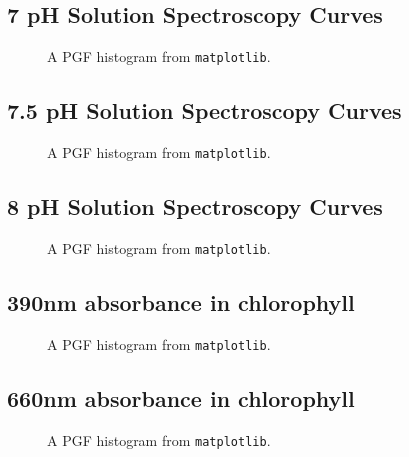 \documentclass[a4paper]{article}
\begin{document}
\subsection*{7 pH Solution Spectroscopy Curves}
\begin{figure}[h]
    \begin{center}
        
    \end{center}
    \caption{A PGF histogram from \texttt{matplotlib}.}
\end{figure}
\newpage

\subsection*{7.5 pH Solution Spectroscopy Curves}
\begin{figure}[h]
    \begin{center}
        
    \end{center}
    \caption{A PGF histogram from \texttt{matplotlib}.}
\end{figure}
\newpage

\subsection*{8 pH Solution Spectroscopy Curves}
\begin{center}
\begin{figure}[h]
        
    \caption{A PGF histogram from \texttt{matplotlib}.}
\end{figure}
\end{center}
\newpage

\subsection*{390nm absorbance in chlorophyll}
\begin{center}
\begin{figure}[h]
        
    \caption{A PGF histogram from \texttt{matplotlib}.}
\end{figure}
\end{center}
\newpage

\subsection*{660nm absorbance in chlorophyll}
\begin{center}
\begin{figure}[h]
        
    \caption{A PGF histogram from \texttt{matplotlib}.}
\end{figure}
\end{center}
\newpage
\end{document}
